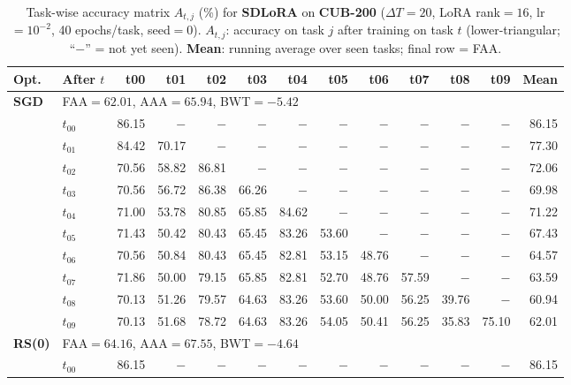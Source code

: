 \begin{table}[ht]
\centering
\caption{%
  Task-wise accuracy matrix $A_{t,j}$ (\%) for \textbf{SDLoRA} on \textbf{CUB-200} ($\Delta T=20$, LoRA rank$=16$, lr$=10^{-2}$, 40 epochs/task, seed$=0$).
  $A_{t,j}$: accuracy on task $j$ after training on task $t$  (lower-triangular; ``$-$'' = not yet seen).
  \textbf{Mean}: running average over seen tasks; final row = FAA.
}
\label{tab:raw_sdlora_cub200}
\setlength{\tabcolsep}{2.8pt}
\renewcommand{\arraystretch}{0.88}
\scriptsize
\begin{tabular}{@{}l l r r r r r r r r r r r@{}}
\toprule
\textbf{Opt.} & \textbf{After $t$} & \textbf{t00} & \textbf{t01} & \textbf{t02} & \textbf{t03} & \textbf{t04} & \textbf{t05} & \textbf{t06} & \textbf{t07} & \textbf{t08} & \textbf{t09} & \textbf{Mean} \\
\midrule
\multirow{11}{*}{\textbf{SGD}} & \multicolumn{12}{l}{\quad\small FAA$=62.01$,\; AAA$=65.94$,\; BWT$=-5.42$} \\
 & $t_{00}$ & 86.15 & $-$ & $-$ & $-$ & $-$ & $-$ & $-$ & $-$ & $-$ & $-$ & 86.15 \\
 & $t_{01}$ & 84.42 & 70.17 & $-$ & $-$ & $-$ & $-$ & $-$ & $-$ & $-$ & $-$ & 77.30 \\
 & $t_{02}$ & 70.56 & 58.82 & 86.81 & $-$ & $-$ & $-$ & $-$ & $-$ & $-$ & $-$ & 72.06 \\
 & $t_{03}$ & 70.56 & 56.72 & 86.38 & 66.26 & $-$ & $-$ & $-$ & $-$ & $-$ & $-$ & 69.98 \\
 & $t_{04}$ & 71.00 & 53.78 & 80.85 & 65.85 & 84.62 & $-$ & $-$ & $-$ & $-$ & $-$ & 71.22 \\
 & $t_{05}$ & 71.43 & 50.42 & 80.43 & 65.45 & 83.26 & 53.60 & $-$ & $-$ & $-$ & $-$ & 67.43 \\
 & $t_{06}$ & 70.56 & 50.84 & 80.43 & 65.45 & 82.81 & 53.15 & 48.76 & $-$ & $-$ & $-$ & 64.57 \\
 & $t_{07}$ & 71.86 & 50.00 & 79.15 & 65.85 & 82.81 & 52.70 & 48.76 & 57.59 & $-$ & $-$ & 63.59 \\
 & $t_{08}$ & 70.13 & 51.26 & 79.57 & 64.63 & 83.26 & 53.60 & 50.00 & 56.25 & 39.76 & $-$ & 60.94 \\
 & $t_{09}$ & 70.13 & 51.68 & 78.72 & 64.63 & 83.26 & 54.05 & 50.41 & 56.25 & 35.83 & 75.10 & 62.01 \\
\midrule
\multirow{11}{*}{\textbf{RS(0)}} & \multicolumn{12}{l}{\quad\small FAA$=64.16$,\; AAA$=67.55$,\; BWT$=-4.64$} \\
 & $t_{00}$ & 86.15 & $-$ & $-$ & $-$ & $-$ & $-$ & $-$ & $-$ & $-$ & $-$ & 86.15 \\

\end{tabular}
\end{table}
